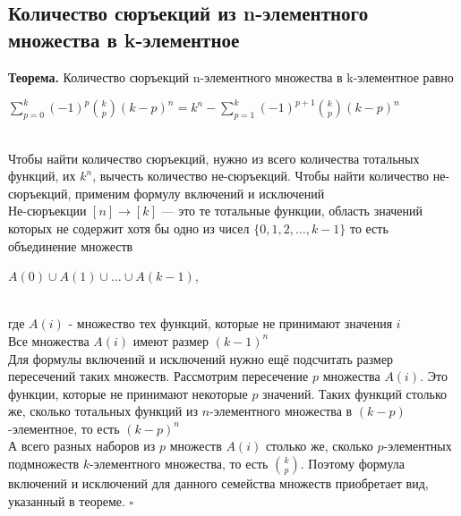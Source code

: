 \documentclass[a4paper]{article}
\newcommand{\qed}{\hfill$\square$}
\begin{document}
\subsection{Количество сюръекций из n-элементного множества в k-элементное}
\textbf{Теорема.} Количество сюръекций n-элементного множества в k-элементное равно\\[2mm]
\centerline{$\sum\limits_{p=0}^k(-1)^p\binom{k}{p}(k-p)^n=k^n-\sum\limits_{p=1}^k(-1)^{p+1}\binom{k}{p}(k-p)^n$}\\[2mm]
\indent Чтобы найти количество сюръекций, нужно из всего количества тотальных функций, их $k^n$, вычесть количество не-сюръекций. Чтобы найти количество не-сюръекций, применим формулу включений и исключений\\[2mm]
\indent Не-сюръекции $[n]\rightarrow[k]$ — это те тотальные функции, область значений которых не содержит хотя бы одно из чисел $\{0,1,2,\ldots,k-1\}$ то есть объединение множеств\\[2mm]
\centerline{$A(0) \cup A(1) \cup \ldots \cup A(k-1)$,}\\[2mm]
где $A(i)$ - множество тех функций, которые не принимают значения $i$\\[2mm]
\indent Все множества $A(i)$ имеют размер $(k-1)^n$\\[2mm]
\indent Для формулы включений и исключений нужно ещё подсчитать размер пересечений таких множеств. Рассмотрим пересечение $p$ множества $A(i)$. Это функции, которые не принимают некоторые $p$ значений. Таких функций столько же, сколько тотальных функций из $n$-элементного множества в $(k-p)$-элементное, то есть $(k-p)^n$\\[2mm]
\indent А всего разных наборов из $p$ множеств $A(i)$ столько же, сколько $p$-элементных подмножеств $k$-элементного множества, то есть $\binom{k}{p}$. Поэтому формула включений и исключений для данного семейства множеств приобретает вид, указанный в теореме. \qed
\end{document}
